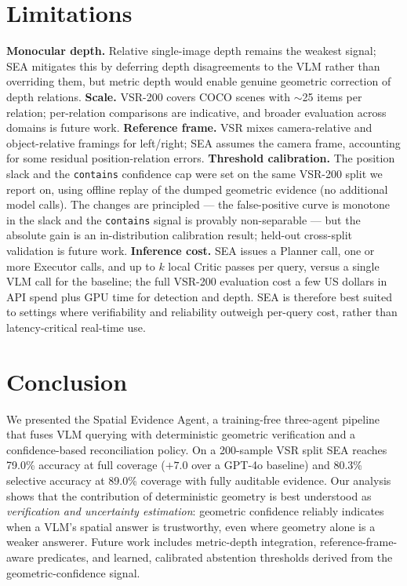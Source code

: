\documentclass[10pt,twocolumn,letterpaper]{article}
\newcommand{\rel}[1]{\texttt{#1}}
\begin{document}
\section{Limitations}
\textbf{Monocular depth.} Relative single-image depth remains the weakest
signal; SEA mitigates this by deferring depth disagreements to the VLM rather
than overriding them, but metric depth would enable genuine geometric
correction of depth relations.
\textbf{Scale.} VSR-200 covers COCO scenes with $\sim$25 items per relation;
per-relation comparisons are indicative, and broader evaluation across domains
is future work.
\textbf{Reference frame.} VSR mixes camera-relative and object-relative
framings for left/right; SEA assumes the camera frame, accounting for some
residual position-relation errors.
\textbf{Threshold calibration.} The position slack and the \rel{contains}
confidence cap were set on the same VSR-200 split we report on, using offline
replay of the dumped geometric evidence (no additional model calls). The
changes are principled --- the false-positive curve is monotone in the slack
and the \rel{contains} signal is provably non-separable --- but the absolute
gain is an in-distribution calibration result; held-out cross-split validation
is future work.
\textbf{Inference cost.} SEA issues a Planner call, one or more Executor
calls, and up to $k$ local Critic passes per query, versus a single VLM call
for the baseline; the full VSR-200 evaluation cost a few US dollars in API
spend plus GPU time for detection and depth. SEA is therefore best suited to
settings where verifiability and reliability outweigh per-query cost, rather
than latency-critical real-time use.

\section{Conclusion}
We presented the Spatial Evidence Agent, a training-free three-agent pipeline
that fuses VLM querying with deterministic geometric verification and a
confidence-based reconciliation policy. On a 200-sample VSR split SEA reaches
79.0\% accuracy at full coverage ($+7.0$ over a GPT-4o baseline) and 80.3\%
selective accuracy at 89.0\% coverage with fully auditable evidence. Our
analysis shows that the contribution of deterministic geometry is best
understood as \emph{verification and uncertainty estimation}: geometric
confidence reliably indicates when a VLM's spatial answer is trustworthy, even
where geometry alone is a weaker answerer. Future work includes metric-depth
integration, reference-frame-aware predicates, and learned, calibrated
abstention thresholds derived from the geometric-confidence signal.
\end{document}
